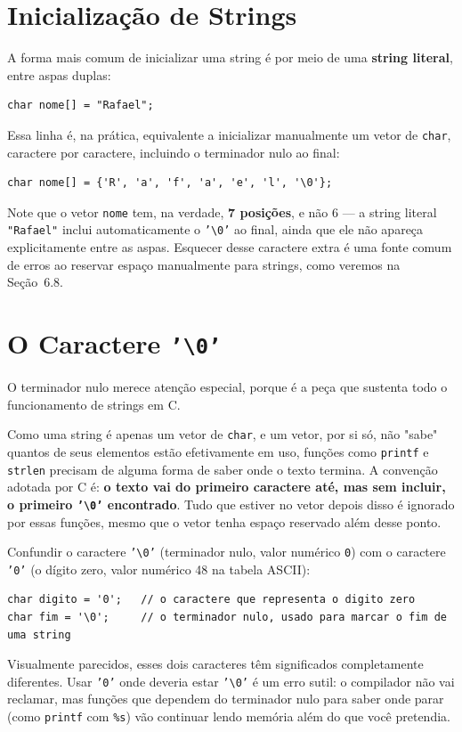 \documentclass[12pt,a4paper,oneside]{extreport}
\begin{document}
\section{Inicialização de Strings}

A forma mais comum de inicializar uma string é por meio de uma \textbf{string literal}, entre aspas duplas:

\begin{lstlisting}
char nome[] = "Rafael";
\end{lstlisting}

Essa linha é, na prática, equivalente a inicializar manualmente um vetor de \texttt{char}, caractere por caractere, incluindo o terminador nulo ao final:

\begin{lstlisting}
char nome[] = {'R', 'a', 'f', 'a', 'e', 'l', '\0'};
\end{lstlisting}

Note que o vetor \texttt{nome} tem, na verdade, \textbf{7 posições}, e não 6 — a string literal \texttt{"Rafael"} inclui automaticamente o \texttt{'\textbackslash 0'} ao final, ainda que ele não apareça explicitamente entre as aspas. Esquecer desse caractere extra é uma fonte comum de erros ao reservar espaço manualmente para strings, como veremos na Seção~6.8.

\section{O Caractere \texttt{'\textbackslash 0'}}

O terminador nulo merece atenção especial, porque é a peça que sustenta todo o funcionamento de strings em C.

Como uma string é apenas um vetor de \texttt{char}, e um vetor, por si só, não "sabe" quantos de seus elementos estão efetivamente em uso, funções como \texttt{printf} e \texttt{strlen} precisam de alguma forma de saber onde o texto termina. A convenção adotada por C é: \textbf{o texto vai do primeiro caractere até, mas sem incluir, o primeiro \texttt{'\textbackslash 0'} encontrado}. Tudo que estiver no vetor depois disso é ignorado por essas funções, mesmo que o vetor tenha espaço reservado além desse ponto.

\begin{errocomum}
Confundir o caractere \texttt{'\textbackslash 0'} (terminador nulo, valor numérico \texttt{0}) com o caractere \texttt{'0'} (o dígito zero, valor numérico 48 na tabela ASCII):
\begin{lstlisting}
char digito = '0';   // o caractere que representa o digito zero
char fim = '\0';     // o terminador nulo, usado para marcar o fim de uma string
\end{lstlisting}
Visualmente parecidos, esses dois caracteres têm significados completamente diferentes. Usar \texttt{'0'} onde deveria estar \texttt{'\textbackslash 0'} é um erro sutil: o compilador não vai reclamar, mas funções que dependem do terminador nulo para saber onde parar (como \texttt{printf} com \texttt{\%s}) vão continuar lendo memória além do que você pretendia.
\end{errocomum}
\end{document}
